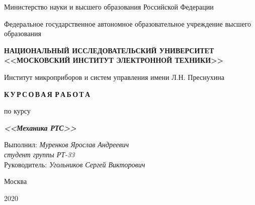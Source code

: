\thispagestyle{empty}
\setcounter{page}{0}

\begin{center}
    Министерство науки  и высшего образования Российской Федерации
    
    \vspace{1ex}

    Федеральное государственное автономное образовательное учреждение высшего образования
    
    \textbf{НАЦИОНАЛЬНЫЙ ИССЛЕДОВАТЕЛЬСКИЙ УНИВЕРСИТЕТ <<МОСКОВСКИЙ ИНСТИТУТ ЭЛЕКТРОННОЙ ТЕХНИКИ>>}
    
    \vspace{1ex}

    Институт микроприборов и систем управления имени Л.Н. Преснухина
\end{center}

\vspace{13ex}

\begin{center}
    \textbf{К\,У\,Р\,С\,О\,В\,А\,Я Р\,А\,Б\,О\,Т\,А}
    \vspace{1ex}

    по курсу
    
    \textbf{\textit{<<Механика РТС>>}}
\end{center}

\vspace{20ex}

\begin{flushright}
    \noindent
    Выполнил: \textit{Муренков Ярослав Андреевич} \\
    \textit{студент группы РТ-33} \\
    Руководитель: \textit{Угольников Сергей Викторович}
\end{flushright}

\vfill

\begin{center}
    Москва

    2020
\end{center}

\newpage
